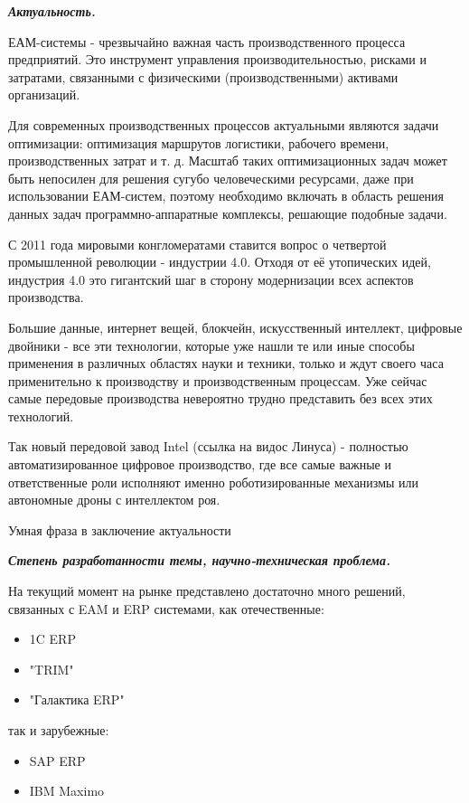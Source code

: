 
\textbf{\textit{Актуальность.}}

ЕАМ-системы - чрезвычайно важная часть производственного процесса предприятий. Это инструмент управления производительностью, рисками и затратами, связанными с физическими (производственными) активами организаций.

Для современных производственных процессов актуальными являются задачи
оптимизации: оптимизация маршрутов логистики, рабочего времени, производственных
затрат и т. д. Масштаб таких оптимизационных задач может быть непосилен для решения
сугубо человеческими ресурсами, даже при использовании ЕАМ-систем, поэтому необходимо включать в область решения данных задач программно-аппаратные комплексы, решающие подобные задачи.

С 2011 года мировыми конгломератами ставится вопрос о четвертой промышленной революции - индустрии 4.0. Отходя от её утопических идей, индустрия 4.0 это гигантский шаг в сторону модернизации всех аспектов производства.

Большие данные, интернет вещей, блокчейн, искусственный интеллект, цифровые двойники - все эти технологии, которые уже нашли те или иные способы применения в различных областях науки и техники, только и ждут своего часа применительно к производству и производственным процессам. Уже сейчас самые передовые производства невероятно трудно представить без всех этих технологий.

Так новый передовой завод Intel (ссылка на видос Линуса) - полностью автоматизированное цифровое производство, где все самые важные и ответственные роли исполняют именно роботизированные механизмы или автономные дроны с интеллектом роя.

Умная фраза в заключение актуальности


\textbf{\textit{Степень разработанности темы, научно-техническая проблема.}}

На текущий момент на рынке представлено достаточно много решений, связанных с EAM и ERP системами,  как отечественные:

\begin{itemize}
	\item 1C ERP
	\item "TRIM"
	\item "Галактика ERP"
\end{itemize}

так и зарубежные:

\begin{itemize}
	\item SAP ERP
	\item IBM Maximo
\end{itemize}

